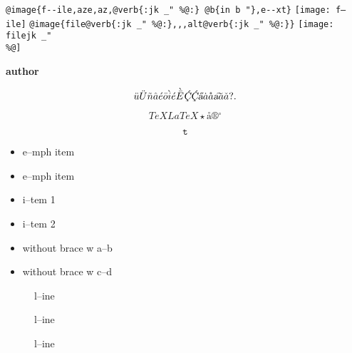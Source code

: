 \documentclass{book}
\renewcommand{\includegraphics}[1]{\fbox{FIG \detokenize{#1}}}
\begin{document}
\begin{titlepage}
\texttt{@image\{f{-}{-}ile,aze,az,@verb\{:jk \_" \%@:\} @b\{in b "\},e{-}{-}xt\}} \texttt{[image: f--ile]}
\texttt{@image\{file@verb\{:jk \_" \%@:\},,,alt@verb\{:jk \_" \%@:\}\}} \texttt{[image: filejk \_" \\\%@]}


{\bfseries author}%

$$
\ddot{u} \ddot{U} \tilde{n} \hat{a} \acute{e} \bar{o} \grave{i} \acute{e} \grave{\bar{E}}
\textsl{\c{\'{C}}} \textsl{\c{\'{C}}} \textsl{\H{a}} \dot{a} \mathring{a} \textsl{\t{a}}
\breve{a} \check{a}
 ? .
$$

$$
TeX LaTeX \star{} \mathord{\text{\aa{}}} \circledR{} ^{\circ{}} 
$$

$$
\mathtt{t} 
$$

\begin{itemize}[label=\emph{}]
\item e--mph item
\end{itemize}

\begin{itemize}[label=\emph{} after emph]
\item e--mph item
\end{itemize}

\begin{itemize}[label=\textbullet{} a--n itemize line]
\item i--tem 1
\item i--tem 2
\end{itemize}

\begin{itemize}[label={}]
\item without brace w a--b
\item without brace w c--d
\end{itemize}

\begin{description}
\item[{\parbox[b]{\linewidth}{%
a}}]
l--ine
\end{description}

\begin{description}
\item[{\parbox[b]{\linewidth}{%
a--missing style formatting}}]
l--ine
\end{description}

\begin{description}
\item[{\parbox[b]{\linewidth}{%
a\\
\index[fn]{a@\texttt{a}}%
\index[cp]{index entry between item and itemx}%
b
\index[fn]{b@\texttt{b}}%
}}]
l--ine
\end{description}


\end{titlepage}
\end{document}
